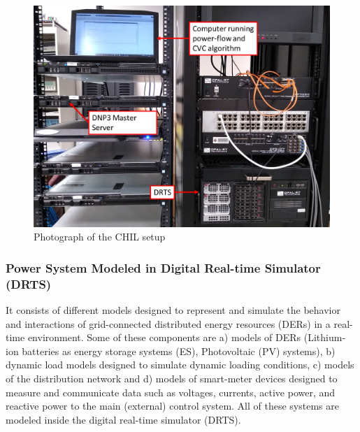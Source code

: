 \begin{figure}[!h]
\centering
\includegraphics[width=\linewidth]{figs/LAB_SETUP.png}
\caption{Photograph of the CHIL setup}
\label{fig:CHIL_SETUP}
\end{figure}


\subsubsection{Power System Modeled in Digital Real-time Simulator (DRTS)}
It consists of different models designed to represent and simulate the behavior and interactions of grid-connected distributed energy resources (DERs) in a real-time environment. Some of these components are a) models of DERs (Lithium-ion batteries as energy storage systems (ES), Photovoltaic (PV) systems), b) dynamic load models designed to simulate dynamic loading conditions,  c) models of the distribution network and d) models of smart-meter devices designed to measure and communicate data such as voltages, currents, active power, and reactive power to the main (external) control system. All of these systems are modeled inside the digital real-time simulator (DRTS). 

